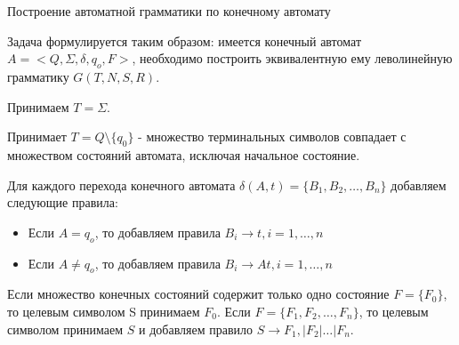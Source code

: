\documentclass[12pt, pdf, hyperref={unicode},handout]{beamer}
\begin{document}
\begin{frame}{Построение автоматной грамматики по конечному автомату}
  \begin{block}

    \small{
      Задача формулируется таким образом: имеется конечный автомат $A=<Q,\Sigma, \delta, q_o, F>$, необходимо построить эквивалентную ему леволинейную грамматику $G(T,N,S,R)$.
      \begin{enumerate}
      \item{Принимаем $T=\Sigma$.}
      \item{Принимает $T=Q\setminus\{q_0\}$ - множество терминальных символов совпадает с множеством состояний автомата, исключая начальное состояние.}
      \item{Для каждого перехода конечного автомата $\delta(A,t)=\{B_1,B_2,\ldots,B_n\}$ добавляем следующие правила:
          \begin{itemize}
          \item{Если $A=q_o$, то добавляем правила $B_i\rightarrow t, i=1,\ldots, n$}
          \item{Если $A\neq q_o$, то добавляем правила $B_i\rightarrow At, i=1,\ldots, n$}
            \end{itemize}
            \item{Если множество конечных состояний содержит только одно состояние $F=\{F_0\}$, то целевым символом S принимаем $F_0$.  Если $F=\{F_1, F_2,\ldots, F_n\}$, то целевым символом принимаем $S$ и добавляем правило $S\rightarrow F_1,|F_2|\ldots| F_n$.}
            
        }
        
        \end{enumerate}

      }
  \end{block}
  
\end{frame}
\end{document}
